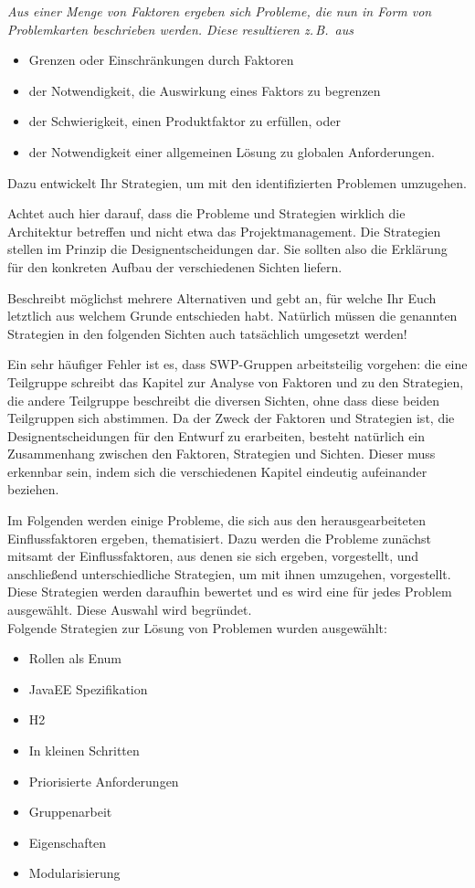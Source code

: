 \documentclass[enabledeprecatedfontcommands,fontsize=12pt,paper=a4,twoside]{scrartcl}
\begin{document}
{ \em Aus einer Menge von Faktoren ergeben sich Probleme, die nun in
  Form von Problemkarten beschrieben werden. Diese resultieren z.\,B.\
  aus
  \begin{itemize}
    \item Grenzen oder Einschränkungen durch Faktoren
    \item der Notwendigkeit, die Auswirkung eines Faktors zu begrenzen
    \item der Schwierigkeit, einen Produktfaktor zu erfüllen, oder
    \item der Notwendigkeit einer allgemeinen Lösung zu globalen
      Anforderungen.
  \end{itemize}
  Dazu entwickelt Ihr Strategien, um mit den identifizierten Problemen
  umzugehen.

  Achtet auch hier darauf, dass die Probleme und Strategien wirklich
  die Architektur betreffen und nicht etwa das Projektmanagement. Die
  Strategien stellen im Prinzip die Designentscheidungen dar. Sie
  sollten also die Erklärung für den konkreten Aufbau der
  verschiedenen Sichten liefern.

  Beschreibt möglichst mehrere Alternativen und gebt an, für welche
  Ihr Euch letztlich aus welchem Grunde entschieden habt. Natürlich
  müssen die genannten Strategien in den folgenden Sichten auch
  tatsächlich umgesetzt werden!

  Ein sehr häufiger Fehler ist es, dass SWP-Gruppen arbeitsteilig
  vorgehen: die eine Teilgruppe schreibt das Kapitel zur Analyse von
  Faktoren und zu den Strategien, die andere Teilgruppe beschreibt die
  diversen Sichten, ohne dass diese beiden Teilgruppen sich abstimmen.
  Da der Zweck der Faktoren und Strategien ist, die
  Designentscheidungen für den Entwurf zu erarbeiten, besteht
  natürlich ein Zusammenhang zwischen den Faktoren, Strategien und
  Sichten. Dieser muss erkennbar sein, indem sich die verschiedenen
  Kapitel eindeutig aufeinander beziehen.
}
Im Folgenden werden einige Probleme, die sich aus den herausgearbeiteten Einflussfaktoren ergeben, thematisiert. Dazu werden die Probleme zunächst mitsamt der Einflussfaktoren, aus denen sie sich ergeben, vorgestellt, und anschließend unterschiedliche Strategien, um mit ihnen umzugehen, vorgestellt. \\ Diese Strategien werden daraufhin bewertet und es wird eine für jedes Problem ausgewählt. Diese Auswahl wird begründet. \\ 
Folgende Strategien zur Lösung von Problemen wurden ausgewählt: \\
\begin{itemize}
\item Rollen als Enum
\item JavaEE Spezifikation
\item H2
\item In kleinen Schritten
\item Priorisierte Anforderungen
\item Gruppenarbeit
\item Eigenschaften
\item Modularisierung
\end{itemize}
\end{document}
